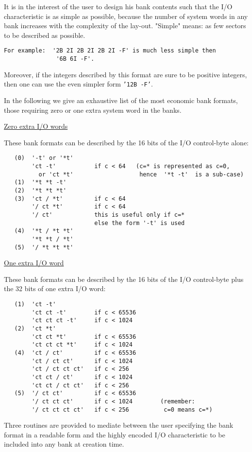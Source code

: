 It is in the interest of the user to design his bank contents
such that the I/O characteristic is as simple as possible,
because the number of system words in any bank increases
with the complexity of the lay-out.
"Simple" means: as few sectors to be described as possible.
\begin{verbatim}
For example:  '2B 2I 2B 2I 2B 2I -F' is much less simple then
               '6B 6I -F'.
\end{verbatim} 
Moreover, if the integers described by this format are sure to
be positive integers, then one can use the even simpler form
{\tt '12B -F'}.

In the following we give an exhaustive list of the most
economic bank formats, those requiring zero or one extra system
word in the banks.

\ul{Zero extra I/O words}

These bank formats can be described by the 16 bits of the
I/O control-byte alone:
\begin{verbatim}
   (0)  '-t' or '*t'
        'ct -t'           if c < 64   (c=* is represented as c=0,
          or 'ct *t'                   hence  '*t -t'  is a sub-case)
   (1)  '*t *t -t'
   (2)  '*t *t *t'
   (3)  'ct / *t'         if c < 64
        '/ ct *t'         if c < 64
        '/ ct'            this is useful only if c=*
                          else the form '-t' is used
   (4)  '*t / *t *t'
        '*t *t / *t'
   (5)  '/ *t *t *t'
\end{verbatim} 
\ul{One extra I/O word}

These bank formats can be described by the 16 bits of the
I/O control-byte plus the 32 bits of one extra I/O word:
\begin{verbatim}
   (1)  'ct -t'
        'ct ct -t'        if c < 65536
        'ct ct ct -t'     if c < 1024
   (2)  'ct *t'
        'ct ct *t'        if c < 65536
        'ct ct ct *t'     if c < 1024
   (4)  'ct / ct'         if c < 65536
        'ct / ct ct'      if c < 1024
        'ct / ct ct ct'   if c < 256
        'ct ct / ct'      if c < 1024
        'ct ct / ct ct'   if c < 256
   (5)  '/ ct ct'         if c < 65536
        '/ ct ct ct'      if c < 1024        (remember:
        '/ ct ct ct ct'   if c < 256          c=0 means c=*)
\end{verbatim} 


Three routines are provided to mediate between the user
specifying the bank format in a readable form
and the highly encoded I/O characteristic
to be included into any bank at creation time.

